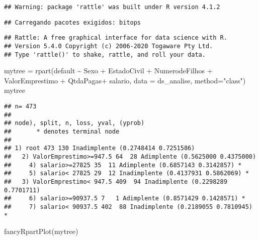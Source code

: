 \documentclass[
]{article}
\newenvironment{Shaded}{\begin{snugshade}}{\end{snugshade}}
\newcommand{\AttributeTok}[1]{\textcolor[rgb]{0.77,0.63,0.00}{#1}}
\newcommand{\FunctionTok}[1]{\textcolor[rgb]{0.00,0.00,0.00}{#1}}
\newcommand{\NormalTok}[1]{#1}
\newcommand{\OtherTok}[1]{\textcolor[rgb]{0.56,0.35,0.01}{#1}}
\newcommand{\SpecialCharTok}[1]{\textcolor[rgb]{0.00,0.00,0.00}{#1}}
\newcommand{\StringTok}[1]{\textcolor[rgb]{0.31,0.60,0.02}{#1}}
\begin{document}
\begin{verbatim}
## Warning: package 'rattle' was built under R version 4.1.2
\end{verbatim}

\begin{verbatim}
## Carregando pacotes exigidos: bitops
\end{verbatim}

\begin{verbatim}
## Rattle: A free graphical interface for data science with R.
## Version 5.4.0 Copyright (c) 2006-2020 Togaware Pty Ltd.
## Type 'rattle()' to shake, rattle, and roll your data.
\end{verbatim}

\begin{Shaded}
\begin{Highlighting}[]
\NormalTok{mytree }\OtherTok{=} \FunctionTok{rpart}\NormalTok{(default }\SpecialCharTok{\textasciitilde{}}\NormalTok{ Sexo }\SpecialCharTok{+} 
\NormalTok{                EstadoCivil }\SpecialCharTok{+} 
\NormalTok{                NumerodeFilhos }\SpecialCharTok{+} 
\NormalTok{                ValorEmprestimo }\SpecialCharTok{+}
\NormalTok{                QtdaPagas}\SpecialCharTok{+} 
\NormalTok{                salario,}
                \AttributeTok{data =}\NormalTok{ ds\_analise,}
                \AttributeTok{method=}\StringTok{"class"}\NormalTok{)}
\NormalTok{mytree}
\end{Highlighting}
\end{Shaded}

\begin{verbatim}
## n= 473 
## 
## node), split, n, loss, yval, (yprob)
##       * denotes terminal node
## 
## 1) root 473 130 Inadimplente (0.2748414 0.7251586)  
##   2) ValorEmprestimo>=947.5 64  28 Adimplente (0.5625000 0.4375000)  
##     4) salario>=27825 35  11 Adimplente (0.6857143 0.3142857) *
##     5) salario< 27825 29  12 Inadimplente (0.4137931 0.5862069) *
##   3) ValorEmprestimo< 947.5 409  94 Inadimplente (0.2298289 0.7701711)  
##     6) salario>=90937.5 7   1 Adimplente (0.8571429 0.1428571) *
##     7) salario< 90937.5 402  88 Inadimplente (0.2189055 0.7810945) *
\end{verbatim}

\begin{Shaded}
\begin{Highlighting}[]
\FunctionTok{fancyRpartPlot}\NormalTok{(mytree)}
\end{Highlighting}
\end{Shaded}
\end{document}
